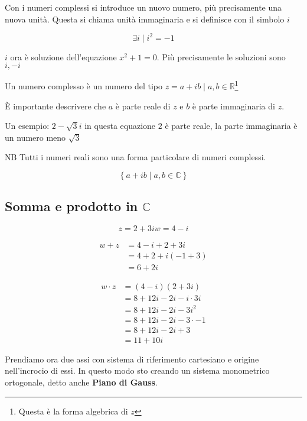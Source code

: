Con i numeri complessi si introduce un nuovo numero, più precisamente una nuova unità. Questa si chiama unità immaginaria e si definisce con il simbolo $i$

\[ \exists i \mid i^2 = -1 \]

$i$ ora è soluzione dell'equazione $x^2 + 1 = 0$. Più precisamente le soluzioni sono $ i, -i$


Un numero complesso è un numero del tipo $z = a+ib \mid a,b \in \mathbb{R}$\footnote{Questa è la forma algebrica di $z$}

È importante descrivere che $a$ è parte reale di $z$ e $b$ è parte immaginaria di $z$.

Un esempio: $2-\sqrt{3}i$ in questa equazione $2$ è parte reale, la parte immaginaria è un numero meno $\sqrt{3}$

NB Tutti i numeri reali sono una forma particolare di numeri complessi.

\[ \left\{a+ib \mid a,b \in \mathbb{C} \right\} \]

\subsection{Somma e prodotto in $\mathbb{C}$}

\begin{equation*}
    z = 2 +3i
    w = 4-i
\end{equation*}

\begin{align*}
    w+z &= 4-i+2+3i\\
    &=4+2+i(-1+3) \\
    &=6+2i
\end{align*}

\begin{align*}
    w \cdot z &= (4 -i)(2+3i) \\
    &=8+12i-2i-i \cdot 3i \\
    &=8+12i-2i-3i^2 \\
    &=8+12i-2i-3 \cdot -1 \\
    &=8+12i-2i+3 \\
    &=11+10i
\end{align*}

Prendiamo ora due assi con sistema di riferimento cartesiano e origine nell'incrocio di essi. In questo modo sto creando un sistema monometrico ortogonale, detto anche \textbf{Piano di Gauss}.

